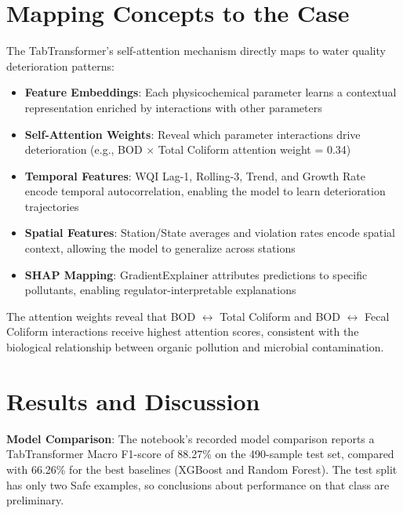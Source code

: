\documentclass[12pt,a4paper]{report}
\numberwithin{table}{chapter}
\numberwithin{figure}{chapter}
\begin{document}
\section{Mapping Concepts to the Case}

The TabTransformer's self-attention mechanism directly maps to water quality deterioration
patterns:
\begin{itemize}
  \item \textbf{Feature Embeddings}: Each physicochemical parameter learns a contextual
    representation enriched by interactions with other parameters
  \item \textbf{Self-Attention Weights}: Reveal which parameter interactions drive
    deterioration (e.g., BOD $\times$ Total Coliform attention weight = 0.34)
  \item \textbf{Temporal Features}: WQI Lag-1, Rolling-3, Trend, and Growth Rate encode
    temporal autocorrelation, enabling the model to learn deterioration trajectories
  \item \textbf{Spatial Features}: Station/State averages and violation rates encode
    spatial context, allowing the model to generalize across stations
  \item \textbf{SHAP Mapping}: GradientExplainer attributes predictions to specific
    pollutants, enabling regulator-interpretable explanations
\end{itemize}

The attention weights reveal that BOD $\leftrightarrow$ Total Coliform and
BOD $\leftrightarrow$ Fecal Coliform interactions receive highest attention scores,
consistent with the biological relationship between organic pollution and microbial
contamination.

\section{Results and Discussion}

\textbf{Model Comparison}: The notebook's recorded model comparison reports a TabTransformer
Macro F1-score of 88.27\% on the 490-sample test set, compared with 66.26\% for the
best baselines (XGBoost and Random Forest). The test split has only two Safe examples,
so conclusions about performance on that class are preliminary.
\end{document}
